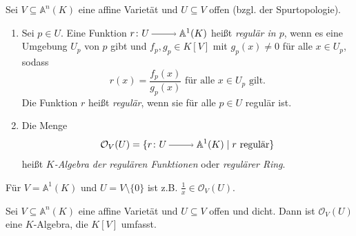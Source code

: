 \documentclass[a4paper,12pt,index=toc]{scrbook}
\theoremstyle{keinenummern} %
\def\A{\mathbb{A}}
\def\O{\mathcal{O}}
\begin{document}
\begin{dfn}\label{1.5.3}
  Sei $V\subseteq\A^n(K)$ eine affine Varietät und $U\subseteq V$ offen (bzgl. der Spurtopologie).
  \begin{enumerate}
  \item{} Sei $p\in U$. Eine Funktion $r\colon U\ra\A^1(K)$ heißt \emph{regulär in $p$}, wenn es eine Umgebung $U_p$ von $p$ gibt
    und $f_p,g_p\in K[V]$ mit $g_p(x)\neq0$ für alle $x\in U_p$, sodass\begin{equation*}r(x)=\frac{f_p(x)}{g_p(x)}\text{ für alle }x\in U_p\text{ gilt.}\end{equation*} Die Funktion $r$ heißt \emph{regulär}, wenn sie für alle $p\in U$ regulär ist.
  \item{} Die Menge \begin{equation*}\O_V(U) = \{ r\colon U\ra \A^1(K) \mid r \text{ regulär}\}\end{equation*} heißt \emph{$K$-Algebra der regulären
      Funktionen} oder \emph{regulärer Ring}.
  \end{enumerate}
\end{dfn}

\begin{nbsp}
  Für $V=\A^1(K)$ und $U=V\setminus\{0\}$ ist z.B. $\frac1x\in\O_V(U)$.
\end{nbsp}

\begin{bem}\label{1.5.4}
  Sei $V\subseteq\A^n(K)$ eine affine Varietät und $U\subseteq V$ offen und dicht. Dann ist $\O_V(U)$ eine $K$-Algebra, die $K[V]$
  umfasst.
\end{bem}
\end{document}
